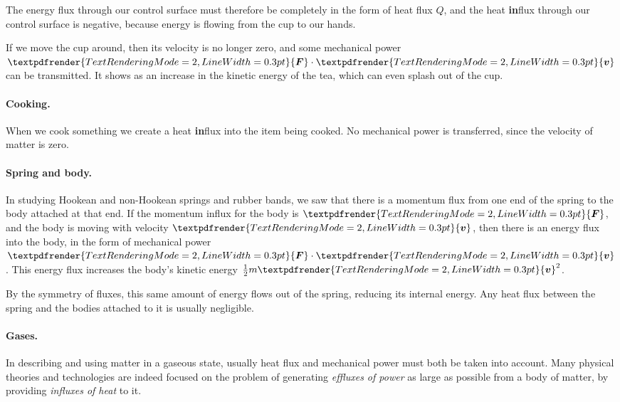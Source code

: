 \documentclass[a4paper,12pt,%
onecolumn,oneside,titlepage,%
british%
]{memoir}
\renewcommand*{\bm}[1]{\textpdfrender{TextRenderingMode=2,LineWidth=0.3pt}{\boldsymbol{#1}}}
\renewcommand*{\|}[1][]{\nonscript\:#1\vert\nonscript\:\mathopen{}}
\newcommand*{\yv}{\bm{v}}
\newcommand*{\yM}{m}%
\newcommand*{\yQ}{Q}%
\newcommand*{\yF}{\bm{F}}
\begin{document}
The energy flux through our control surface must therefore be completely in the form of heat flux $\yQ$, and the heat \textbf{in}flux through our control surface is negative, because energy is flowing from the cup to our hands.

If we move the cup around, then its velocity is no longer zero, and some mechanical power $\yF\cdot\yv$ can be transmitted. It shows as an increase in the kinetic energy of the tea, which can even splash out of the cup.

\paragraph{Cooking.}
When we cook something we create a heat \textbf{in}flux into the item being cooked. No mechanical power is transferred, since the velocity of matter is zero.

\paragraph{Spring and body.}
In studying Hookean and non-Hookean springs and rubber bands, we saw that there is a momentum flux from one end of the spring to the body attached at that end. If the momentum influx for the body is $\yF$, and the body is moving with velocity $\yv$, then there is an energy flux into the body, in the form of mechanical power $\yF\cdot \yv$. This energy flux increases the body's kinetic energy $\tfrac12\yM\yv^{2}$.

By the symmetry of fluxes, this same amount of energy flows out of the spring, reducing its internal energy. Any heat flux between the spring and the bodies attached to it is usually negligible.

\paragraph{Gases.}

In describing and using matter in a gaseous state, usually heat flux and mechanical power must both be taken into account. Many physical theories and technologies are indeed focused on the problem of generating \emph{effluxes of power} as large as possible from a body of matter, by providing \emph{influxes of heat} to it.
\end{document}
